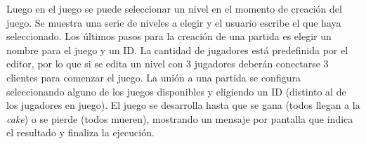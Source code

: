 \documentclass[a4paper]{article}
\begin{document}
Luego en el juego se puede seleccionar un nivel en el momento de creación del juego. Se muestra una serie de niveles a elegir y el usuario escribe el que haya seleccionado. Los últimos pasos para la creación de una partida es elegir un nombre para el juego y un ID. La cantidad de jugadores está predefinida por el editor, por lo que si se edita un nivel con 3 jugadores deberán conectarse 3 clientes para comenzar el juego. La unión a una partida se configura seleccionando alguno de los juegos disponibles y eligiendo un ID (distinto al de los jugadores en juego). El juego se desarrolla hasta que se gana (todos llegan a la \textit{cake}) o se pierde (todos mueren), mostrando un mensaje por pantalla que indica el resultado y finaliza la ejecución.
\end{document}
